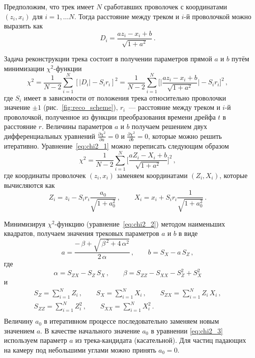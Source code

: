 Предположим, что трек имеет $N$ сработавших проволочек с координатами
$(z_i, x_i)$ для $i = 1, \ldots N$. Тогда расстояние между треком и $i$-й
проволочкой можно выразить как
\begin{equation}
  D_i = \frac{a z_i - x_i + b}{\sqrt{1 + a^{2}}}\,.
\end{equation}

Задача реконструкции трека состоит в получении параметров прямой $a$ и $b$
путём минимизации $\chi^2$-функции
\begin{equation}
  \label{eq:chi2_1}
  \chi^2 = \frac{1}{N-2}\sum_{i=1}^{N} [|D_i| -S_ir_i]^2 =
  \frac{1}{N-2}\sum_{i=1}^{N} \biggl[
  \Big|\frac{az_i - x_i + b}{\sqrt{1 + a^2}}\Big| - S_ir_i\biggr]^2\,,
\end{equation}
где $S_i$ имеет в зависимости от положения трека относительно проволочки
значение $\pm{1}$ (рис.~\ref{fig:reco_scheme}), $r_i$~--- расстояние между
треком и $i$-й проволочкой, полученное из функции преобразования времени дрейфа
$t$ в расстояние $r$. Величины параметров $a$ и $b$ получаем решением двух
дифференциальных уравнений
$\frac{\partial \chi^2}{\partial a} = 0$ и
$\frac{\partial \chi^2}{\partial b} = 0$, которые можно решить итеративно.
Уравнение~\eqref{eq:chi2_1} можно переписать следующим образом
\begin{equation}
  \label{eq:chi2_2}
  \chi^2 = \frac{1}{N-2}\sum_{i=1}^{N}
  \biggl[\frac{aZ_i - X_i + b}{\sqrt{1 + a^2}}\biggr]^2\,,
\end{equation}
где координаты проволочек $(z_i, x_i)$ заменяем координатами $(Z_i, X_i)$,
которые вычисляются как
\begin{equation}
  \label{eq:chi2_3}
  Z_i = z_i - S_ir_i \frac{a_0}{\sqrt{1 + a_0^2}}\,, \qquad
  X_i = x_i + S_ir_i \frac{1}{\sqrt{1 + a_0^2}}\,.
\end{equation}

Минимизируя $\chi^2$-функцию (уравнение~\eqref{eq:chi2_2}) методом наименьших
квадратов, получаем значения трековых параметров $a$ и $b$ в виде
\begin{equation}
  a = \frac{-\,\beta + \sqrt{\,\beta^{\,2} + 4\,\alpha^2}}{2\,\alpha}\,, \qquad
  b = S_X - a\,S_Z\,,
\end{equation}
где
\begin{equation}
  \alpha = S_{ZX} - S_Z\,S_X\,, \qquad
  \beta = S_{ZZ} - S_{XX} - S_Z^2 + S_X^2
\end{equation}
и
\begin{equation}
  \begin{split}
    S_Z = \sum_{i=1}^{N} Z_i\,, \qquad
    S_X = \sum_{i=1}^{N} X_i\,, \qquad
    S_{ZX} = \sum_{i=1}^{N} Z_i \, X_i\,, \\
    S_{ZZ} = \sum_{i=1}^{N} Z_i^2\,, \qquad
    S_{XX} = \sum_{i=1}^{N} X_i^2\,. \qquad \qquad \\
  \end{split}
\end{equation}
Величину $a_0$ в итеративном процессе последовательно заменяем новым значением
$a$. В качестве начального значение $a_0$ в уравнении \eqref{eq:chi2_3}
используем параметр $a$ из трека-кандидата (касательной). Для частиц падающих
на камеру под небольшими углами можно принять $a_0 = 0$.

